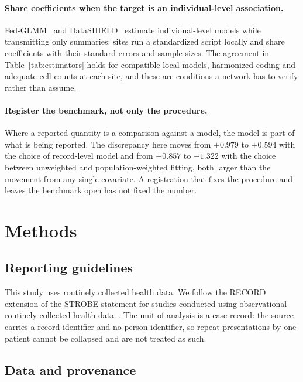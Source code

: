 \documentclass[11pt]{article}
\begin{document}
\paragraph{Share coefficients when the target is an individual-level
association.}  Fed-GLMM~\cite{yan2023fedglmm} and
DataSHIELD~\cite{banerjee2022dssurvival} estimate individual-level
models while transmitting only summaries: sites run a standardized
script locally and share coefficients with their standard errors and
sample sizes.  The agreement in Table~\ref{tab:estimators} holds for
compatible local models, harmonized coding and adequate cell counts at
each site, and these are conditions a network has to verify rather than
assume.

\paragraph{Register the benchmark, not only the procedure.}
Where a reported quantity is a comparison against a model, the model is
part of what is being reported.  The discrepancy here moves from
$+0.979$ to $+0.594$ with the choice of record-level model and from
$+0.857$ to $+1.322$ with the choice between unweighted and
population-weighted fitting, both larger than the movement from any
single covariate.  A registration that fixes the procedure and leaves
the benchmark open has not fixed the number.

\section{Methods}

\subsection{Reporting guidelines}

This study uses routinely collected health data.  We follow the RECORD
extension of the STROBE statement for studies conducted using
observational routinely collected health data~\cite{benchimol2015record}.
The unit of analysis is a case record: the source carries a record
identifier and no person identifier, so repeat presentations by one
patient cannot be collapsed and are not treated as such.

\subsection{Data and provenance}
\end{document}
